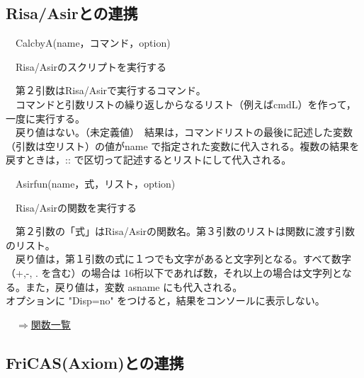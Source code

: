 \documentclass[papersize,a4paper,12pt,uplatex]{jsarticle}
\begin{document}
\subsection{Risa/Asirとの連携}

\begin{description}

\hypertarget{calcbyA}{}
\item[関数]　CalcbyA(name，コマンド，option)
\item[機能]　Risa/Asirのスクリプトを実行する
\item[説明]　第２引数はRisa/Asirで実行するコマンド。\\
　コマンドと引数リストの繰り返しからなるリスト（例えばcmdL）を作って，一度に実行する。\\
　戻り値はない。（未定義値）　結果は，コマンドリストの最後に記述した変数（引数は空リスト）の値がname で指定された変数に代入される。複数の結果を戻すときは，:: で区切って記述するとリストにして代入される。\\

\hypertarget{asirfun}{}
\item[関数]　Asirfun(name，式，リスト，option)
\item[機能]　Risa/Asirの関数を実行する
\item[説明]　第２引数の「式」はRisa/Asirの関数名。第３引数のリストは関数に渡す引数のリスト。\\
　戻り値は，第１引数の式に１つでも文字があると文字列となる。すべて数字（+,-, . を含む）の場合は
16桁以下であれば数，それ以上の場合は文字列となる。また，戻り値は，変数 asname にも代入される。\\
オプションに "Disp=no" をつけると，結果をコンソールに表示しない。\\

\end{description}
\begin{flushright}　\hyperlink{functionlist}{$\Rightarrow$関数一覧}\end{flushright}
\newpage
\subsection{FriCAS(Axiom)との連携}
\end{document}
